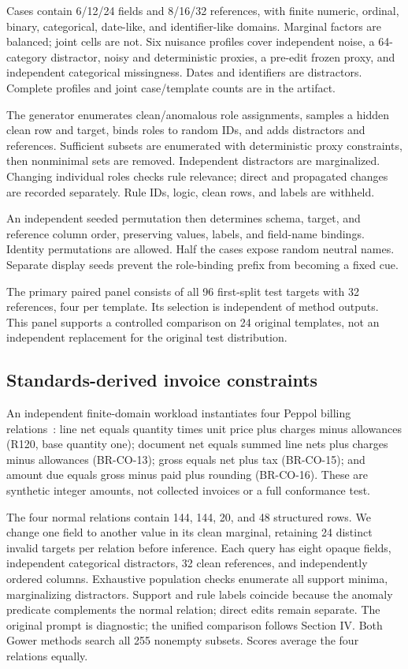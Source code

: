 \documentclass[conference]{IEEEtran}
\begin{document}
Cases contain 6/12/24 fields and 8/16/32 references, with finite numeric, ordinal, binary, categorical, date-like, and identifier-like domains. Marginal factors are balanced; joint cells are not. Six nuisance profiles cover independent noise, a 64-category distractor, noisy and deterministic proxies, a pre-edit frozen proxy, and independent categorical missingness. Dates and identifiers are distractors. Complete profiles and joint case/template counts are in the artifact.

The generator enumerates clean/anomalous role assignments, samples a hidden clean row and target, binds roles to random IDs, and adds distractors and references. Sufficient subsets are enumerated with deterministic proxy constraints, then nonminimal sets are removed. Independent distractors are marginalized. Changing individual roles checks rule relevance; direct and propagated changes are recorded separately. Rule IDs, logic, clean rows, and labels are withheld.

An independent seeded permutation then determines schema, target, and reference column order, preserving values, labels, and field-name bindings. Identity permutations are allowed. Half the cases expose random neutral names. Separate display seeds prevent the role-binding prefix from becoming a fixed cue.




The primary paired panel consists of all 96 first-split test targets with 32 references, four per template. Its selection is independent of method outputs. This panel supports a controlled comparison on 24 original templates, not an independent replacement for the original test distribution.

\subsection{Standards-derived invoice constraints}

An independent finite-domain workload instantiates four Peppol billing relations~\cite{peppol2026billing}: line net equals quantity times unit price plus charges minus allowances (R120, base quantity one); document net equals summed line nets plus charges minus allowances (BR-CO-13); gross equals net plus tax (BR-CO-15); and amount due equals gross minus paid plus rounding (BR-CO-16). These are synthetic integer amounts, not collected invoices or a full conformance test.

The four normal relations contain 144, 144, 20, and 48 structured rows. We change one field to another value in its clean marginal, retaining 24 distinct invalid targets per relation before inference. Each query has eight opaque fields, independent categorical distractors, 32 clean references, and independently ordered columns. Exhaustive population checks enumerate all support minima, marginalizing distractors. Support and rule labels coincide because the anomaly predicate complements the normal relation; direct edits remain separate. The original prompt is diagnostic; the unified comparison follows Section IV. Both Gower methods search all 255 nonempty subsets. Scores average the four relations equally.
\end{document}
